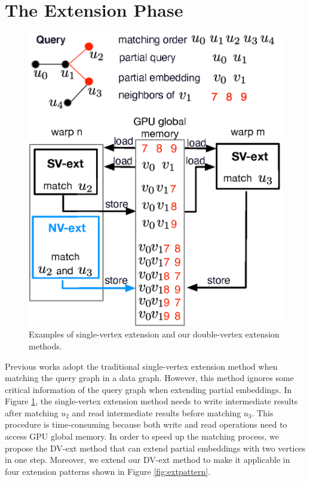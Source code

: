 \section{The Extension Phase\label{sec:extensionphase}}
\begin{figure}
\centering
\includegraphics[width=0.9\columnwidth]{./figure/doubleext.eps}
\caption{Examples of single-vertex extension and our double-vertex extension methods.}	
\label{fig:doubleext}
\end{figure}
Previous works \cite{zeng2020gsi,sun2020subgraph} adopt the traditional single-vertex extension method when matching the query graph in a data graph. However, this method ignores some critical information of the query graph when extending partial embeddings. In Figure \ref{fig:doubleext}, the single-vertex extension method needs to write intermediate results after matching $u_2$ and read intermediate results before matching $u_3$. This procedure is time-consuming because both write and read operations need to access GPU global memory. In order to speed up the matching process, we propose the DV-ext method that can extend partial embeddings with two vertices in one step. Moreover, we extend our DV-ext method to make it applicable in four extension patterns shown in Figure \ref{fig:extpattern}.
